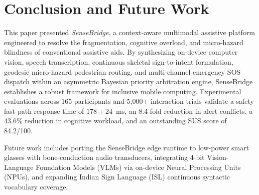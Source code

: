\documentclass[conference]{IEEEtran}
\begin{document}
\section{Conclusion and Future Work}
This paper presented \textit{SenseBridge}, a context-aware multimodal assistive platform engineered to resolve the fragmentation, cognitive overload, and micro-hazard blindness of conventional assistive aids. By synthesizing on-device computer vision, speech transcription, continuous skeletal sign-to-intent formulation, geodesic micro-hazard pedestrian routing, and multi-channel emergency SOS dispatch within an asymmetric Bayesian priority arbitration engine, SenseBridge establishes a robust framework for inclusive mobile computing. Experimental evaluations across 165 participants and 5,000+ interaction trials validate a safety fast-path response time of $178\pm 24$~ms, an 8.4-fold reduction in alert conflicts, a 43.6\% reduction in cognitive workload, and an outstanding SUS score of 84.2/100.

Future work includes porting the SenseBridge edge runtime to low-power smart glasses with bone-conduction audio transducers, integrating 4-bit Vision-Language Foundation Models (VLMs) via on-device Neural Processing Units (NPUs), and expanding Indian Sign Language (ISL) continuous syntactic vocabulary coverage.
\end{document}
